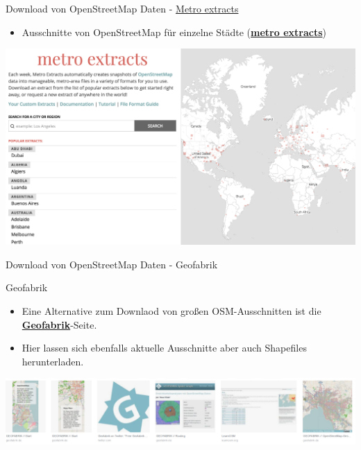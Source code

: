 \documentclass[ignorenonframetext,]{beamer}
\providecommand{\tightlist}{%
  \setlength{\itemsep}{0pt}\setlength{\parskip}{0pt}}
\begin{document}
\begin{frame}{Download von OpenStreetMap Daten -
\href{https://mapzen.com/}{Metro extracts}}
\protect\hypertarget{download-von-openstreetmap-daten---metro-extracts}{}

\begin{itemize}
\tightlist
\item
  Ausschnitte von OpenStreetMap für einzelne Städte
  (\href{https://mapzen.com/data/metro-extracts/}{\textbf{metro
  extracts}})
\end{itemize}

\includegraphics{figure/metroextracts.png}

\end{frame}

\begin{frame}{Download von OpenStreetMap Daten - Geofabrik}
\protect\hypertarget{download-von-openstreetmap-daten---geofabrik}{}

\begin{block}{Geofabrik}

\begin{itemize}
\tightlist
\item
  Eine Alternative zum Downlaod von großen OSM-Ausschnitten ist die
  \href{http://download.geofabrik.de/}{\textbf{Geofabrik}}-Seite.\\
\item
  Hier lassen sich ebenfalls aktuelle Ausschnitte aber auch Shapefiles
  herunterladen.
\end{itemize}

\includegraphics{figure/Geofabrik.PNG}

\end{block}

\end{frame}
\end{document}
